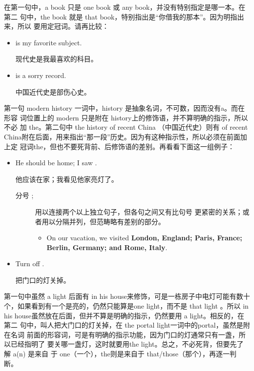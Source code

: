 在第一句中，a book 只是 one book 或 any book，并没有特别指定是哪一本。在第二
句中，the book 就是 that book，特别指出是“你借我的那本”。因为明指出来，所以
要用定冠词。请再比较：
\begin{itemize}
\item  {} is my favorite subject.

  现代史是我最喜欢的科目。
\item  {} is a sorry record.

  中国近代史是部伤心史。
\end{itemize}

第一句 modern history 一词中，history 是抽象名词，不可数，因而没有a。而在形容
词位置上的 modern 只是附在 history上的修饰语，并不算明确的指示，所以不必
加 the。第二句中 the history of recent China （中国近代史）则有 of recent
China附在后面，用来指出“那一段”历史。因为有这种指示性，所以必须在前面加上定
冠词the，但也不要死背前、后修饰语的差别。再看看下面这一组例子：

\begin{itemize}
\item  He should be home; I saw .

  他应该在家；我看见他家亮灯了。

  \begin{description}
  \item[分号 ;]  用以连接两个以上独立句子，但各句之间又有比句号
    更紧密的关系；或者用以分隔并列，但范畴略有差别的部分。
    \begin{itemize}
    \item On our vacation, we visited \textbf{London, England; Paris, France;
        Berlin, Germany; and Rome, Italy}.
    \end{itemize}

  \end{description}

\item  Turn off .

  把门口的灯关掉。
\end{itemize}

第一句中虽然 a light 后面有 in his house来修饰，可是一栋房子中电灯可能有数十
个，如果看到有一个是亮的，仍然只能算是one light，而不是 that light 。所以 in
his house虽然放在后面，但并不算是明确的指示，仍然要用 a light。相反的，在第二
句中，叫人把大门口的灯关掉，在 the portal light一词中的portal，虽然是附在名词
前面的形容词，可是有明确的指示功能，因为门口的灯通常只有一盏，所以已经指明了
要关哪一盏灯，这时就要用the light。总之，不必死背，但要先了解 a(n) 是来自
于 one（一个），the则是来自于 that/those（那个），再逐一判断。

